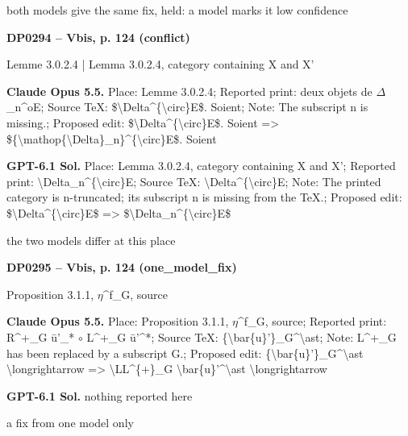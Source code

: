 both models give the same fix, held: a model marks it low confidence\par
\par\noindent\hypertarget{DP0294}{}\textbf{DP0294 -- Vbis, p. 124 (conflict)}\par
Lemme 3.0.2.4 | Lemma 3.0.2.4, category containing X and X'\par
\textbf{Claude Opus 5.5.} Place: Lemme 3.0.2.4; Reported print: deux objets de \ensuremath{\Delta}\_n\textasciicircum{}oE; Source TeX: \$\textbackslash{}Delta\textasciicircum{}\{\textbackslash{}circ\}E\$. Soient; Note: The subscript n is missing.; Proposed edit: \$\textbackslash{}Delta\textasciicircum{}\{\textbackslash{}circ\}E\$. Soient =\allowbreak > \$\{\textbackslash{}mathop\{\textbackslash{}Delta\}\_n\}\textasciicircum{}\{\textbackslash{}circ\}E\$. Soient\par
\textbf{GPT-6.1 Sol.} Place: Lemma 3.0.2.4, category containing X and X'; Reported print: \textbackslash{}Delta\_n\textasciicircum{}\{\textbackslash{}circ\}E; Source TeX: \textbackslash{}Delta\textasciicircum{}\{\textbackslash{}circ\}E; Note: The printed category is n-truncated; its subscript n is missing from the TeX.; Proposed edit: \$\textbackslash{}Delta\textasciicircum{}\{\textbackslash{}circ\}E\$ =\allowbreak > \$\textbackslash{}Delta\_n\textasciicircum{}\{\textbackslash{}circ\}E\$\par
the two models differ at this place\par
\par\noindent\hypertarget{DP0295}{}\textbf{DP0295 -- Vbis, p. 124 (one\_model\_fix)}\par
Proposition 3.1.1, \ensuremath{\eta}\textasciicircum{}f\_G, source\par
\textbf{Claude Opus 5.5.} Place: Proposition 3.1.1, \ensuremath{\eta}\textasciicircum{}f\_G, source; Reported print: R\textasciicircum{}+\_G ū'\_* \ensuremath{\circ} L\textasciicircum{}+\_G ū'\textasciicircum{}*; Source TeX: \{\textbackslash{}bar\{u\}'\}\_G\textasciicircum{}\textbackslash{}ast; Note: L\textasciicircum{}+\_G has been replaced by a subscript G.; Proposed edit: \{\textbackslash{}bar\{u\}'\}\_G\textasciicircum{}\textbackslash{}ast \textbackslash{}longrightarrow =\allowbreak > \textbackslash{}LL\textasciicircum{}\{+\}\_G \textbackslash{}bar\{u\}'\textasciicircum{}\textbackslash{}ast \textbackslash{}longrightarrow\par
\textbf{GPT-6.1 Sol.} nothing reported here\par
a fix from one model only\par
